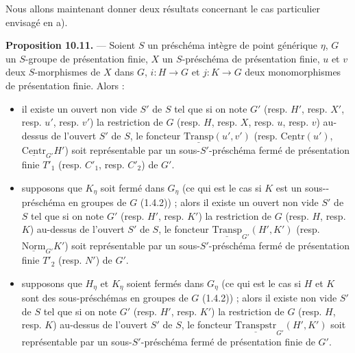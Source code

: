 \documentclass[11pt,a4paper]{article}
\begin{document}
Nous allons maintenant donner deux résultats concernant le cas
particulier envisagé en a).

\textbf{Proposition 10.11.} — Soient $S$ un préschéma intègre de point
générique $\eta$, $G$ un $S$-groupe de présentation finie, $X$ un
$S$-préschéma de présentation finie, $u$ et $v$ deux $S$-morphismes de $X$
dans $G$, $i \colon H \to G$ et $j \colon K \to G$ deux monomorphismes de
présentation finie. Alors :
\begin{itemize}
  \item[(i)] il existe un ouvert non vide $S'$ de $S$ tel que si on note
    $G'$ (resp. $H'$, resp. $X'$, resp. $u'$, resp. $v'$) la restriction
    de $G$ (resp. $H$, resp. $X$, resp. $u$, resp. $v$) au-dessus de
    l'ouvert $S'$ de $S$, le foncteur $\underline{\mathrm{Transp}}(u', v')$
    (resp. $\underline{\mathrm{Centr}}(u')$,
    $\underline{\mathrm{Centr}}_{G'}H'$) soit représentable par un
    sous-$S'$-préschéma fermé de présentation finie $T'_{1}$ (resp.
    $C'_{1}$, resp. $C'_{2}$) de $G'$.
  \item[(ii)] supposons que $K_{\eta}$ soit fermé dans $G_{\eta}$ (ce qui
    est le cas si $K$ est un sous--préschéma en groupes de $G$
    (1.4.2)) ; alors il existe un ouvert non vide $S'$ de $S$ tel que si
    on note $G'$ (resp. $H'$, resp. $K'$) la restriction de $G$ (resp.
    $H$, resp. $K$) au-dessus de l'ouvert $S'$ de $S$, le foncteur
    $\underline{\mathrm{Transp}}_{G'}(H', K')$ (resp.
    $\underline{\mathrm{Norm}}_{G'}K'$) soit représentable par un
    sous-$S'$-préschéma fermé de présentation finie $T'_{2}$ (resp. $N'$)
    de $G'$.
  \item[(iii)] supposons que $H_{\eta}$ et $K_{\eta}$ soient fermés dans
    $G_{\eta}$ (ce qui est le cas si $H$ et $K$ sont des sous-préschémas
    en groupes de $G$ (1.4.2)) ; alors il existe  non vide
    $S'$ de $S$ tel que si on note $G'$ (resp. $H'$, resp. $K'$) la
    restriction de $G$ (resp. $H$, resp. $K$) au-dessus de l'ouvert $S'$
    de $S$, le foncteur $\underline{\mathrm{Transpstr}}_{G'}(H', K')$ soit
    représentable par un sous-$S'$-préschéma fermé de présentation finie
    de $G'$.
\end{itemize}
\end{document}
